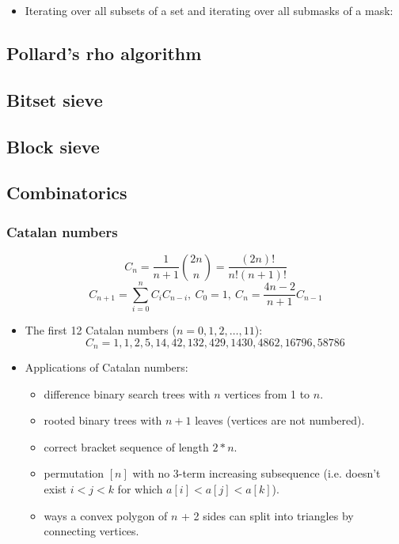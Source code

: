 \begin{itemize}
	\item Iterating over all subsets of a set and iterating over all submasks of a mask:
\end{itemize}

\subsection{Pollard's rho algorithm}

\subsection{Bitset sieve}

\subsection{Block sieve}

\subsection{Combinatorics}
\subsubsection{Catalan numbers}
\[ C_n = \frac{1}{n + 1} {2n \choose n} = \frac{(2n)!}{n!(n+1)!}\]
\[ C_{n + 1} = \displaystyle\sum_{i = 0}^{n}C_i C_{n - i},\ C_0 = 1,\ C_n = \frac{4n - 2}{n + 1}C_{n - 1}\]
\begin{itemize}
	\item The first 12 Catalan numbers ($n = 0, 1, 2, \ldots, 11$): 
	\[ C_n = 1, 1, 2, 5, 14, 42, 132, 429, 1430, 4862, 16796, 58786 \]
	\item Applications of Catalan numbers:
	\begin{itemize}
		\item difference binary search trees with $n$ vertices from 1 to $n$. 
		\item rooted binary trees with $n + 1$ leaves (vertices are not numbered).
		\item correct bracket sequence of length $2 * n$.
		\item permutation $[n]$ with no 3-term increasing subsequence (i.e. doesn't exist $i < j < k$ for which $a[i] < a[j] < a[k]$).
		\item ways a convex polygon of $n$ + 2 sides can split into triangles by connecting vertices. 
	\end{itemize}
\end{itemize}

